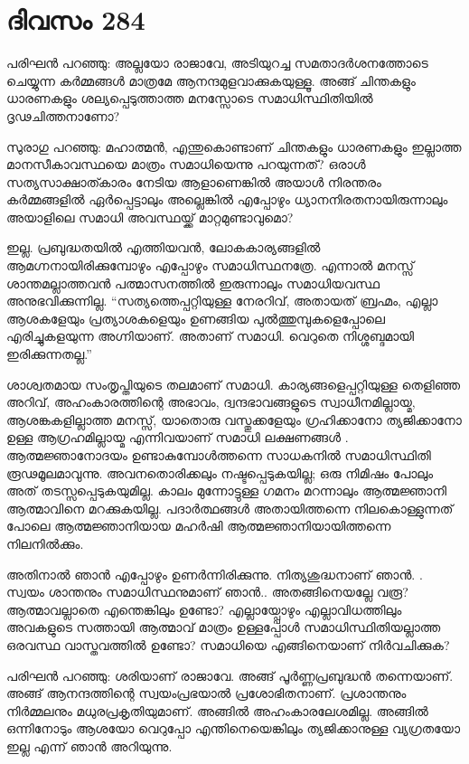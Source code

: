 \section{ദിവസം 284}


പരിഘന്‍ പറഞ്ഞു: അല്ലയോ രാജാവേ, അടിയുറച്ച സമതാദര്‍ശനത്തോടെ ചെയ്യുന്ന കര്‍മ്മങ്ങള്‍ മാത്രമേ ആനന്ദമുളവാക്കുകയുള്ളൂ. അങ്ങ് ചിന്തകളും ധാരണകളും ശല്യപ്പെടുത്താത്ത മനസ്സോടെ സമാധിസ്ഥിതിയില്‍ ദൃഢചിത്തനാണോ?

സുരാഗു പറഞ്ഞു: മഹാത്മന്‍, എന്തുകൊണ്ടാണ് ചിന്തകളും ധാരണകളും ഇല്ലാത്ത മാനസീകാവസ്ഥയെ മാത്രം സമാധിയെന്നു പറയുന്നത്? ഒരാള്‍ സത്യസാക്ഷാത്കാരം നേടിയ ആളാണെങ്കില്‍ അയാള്‍ നിരന്തരം കര്‍മ്മങ്ങളില്‍ ഏര്‍പ്പെട്ടാലും അല്ലെങ്കില്‍ എപ്പോഴും ധ്യാനനിരതനായിരുന്നാലും അയാളിലെ സമാധി അവസ്ഥയ്ക്ക് മാറ്റമുണ്ടാവുമൊ?

ഇല്ല. പ്രബുദ്ധതയില്‍ എത്തിയവന്‍, ലോകകാര്യങ്ങളില്‍ ആമഗ്നനായിരിക്കുമ്പോഴും എപ്പോഴും സമാധിസ്ഥനത്രേ. എന്നാല്‍ മനസ്സ് ശാന്തമല്ലാത്തവന്‍ പത്മാസനത്തില്‍ ഇരുന്നാലും  സമാധിയവസ്ഥ അനുഭവിക്കുന്നില്ല. “സത്യത്തെപ്പറ്റിയുള്ള നേരറിവ്, അതായത് ബ്രഹ്മം, എല്ലാ ആശകളേയും പ്രത്യാശകളെയും ഉണങ്ങിയ പുല്‍ത്തുമ്പുകളെപ്പോലെ എരിച്ചുകളയുന്ന അഗ്നിയാണ്. അതാണ്‌ സമാധി. വെറുതെ നിശ്ശബ്ദമായി ഇരിക്കുന്നതല്ല.”

ശാശ്വതമായ സംതൃപ്തിയുടെ തലമാണ് സമാധി. കാര്യങ്ങളെപ്പറ്റിയുള്ള തെളിഞ്ഞ അറിവ്, അഹംകാരത്തിന്റെ അഭാവം, ദ്വന്ദഭാവങ്ങളുടെ സ്വാധീനമില്ലായ്മ, ആശങ്കകളില്ലാത്ത മനസ്സ്, യാതൊരു വസ്തുക്കളേയും ഗ്രഹിക്കാനോ ത്യജിക്കാനോ ഉള്ള ആഗ്രഹമില്ലായ്മ എന്നിവയാണ് സമാധി ലക്ഷണങ്ങള്‍ .  ആത്മജ്ഞാനോദയം ഉണ്ടാകുമ്പോള്‍ത്തന്നെ സാധകനില്‍ സമാധിസ്ഥിതി രൂഢമൂലമാവുന്നു. അവനതൊരിക്കലും നഷ്ടപ്പെടുകയില്ല; ഒരു നിമിഷം പോലും അത് തടസ്സപ്പെടുകയുമില്ല. കാലം മുന്നോട്ടുള്ള ഗമനം മറന്നാലും ആത്മജ്ഞാനി ആത്മാവിനെ മറക്കുകയില്ല. പദാര്‍ത്ഥങ്ങള്‍ അതായിത്തന്നെ നിലകൊള്ളുന്നത് പോലെ ആത്മജ്ഞാനിയായ മഹര്‍ഷി ആത്മജ്ഞാനിയായിത്തന്നെ നിലനില്‍ക്കും.

അതിനാല്‍ ഞാന്‍ എപ്പോഴും ഉണര്‍ന്നിരിക്കുന്നു. നിത്യശുദ്ധനാണ് ഞാന്‍. . സ്വയം ശാന്തനും സമാധിസ്ഥനുമാണ് ഞാന്‍.. അതങ്ങിനെയല്ലേ വരൂ? ആത്മാവല്ലാതെ എന്തെങ്കിലും ഉണ്ടോ? എല്ലായ്പ്പോഴും എല്ലാവിധത്തിലും അവകളുടെ സത്തായി ആത്മാവ് മാത്രം ഉള്ളപ്പോള്‍ സമാധിസ്ഥിതിയല്ലാത്ത ഒരവസ്ഥ വാസ്തവത്തില്‍ ഉണ്ടോ? സമാധിയെ എങ്ങിനെയാണ് നിര്‍വചിക്കുക? 

പരിഘന്‍ പറഞ്ഞു: ശരിയാണ് രാജാവേ. അങ്ങ് പൂര്‍ണ്ണപ്രബുദ്ധന്‍ തന്നെയാണ്. അങ്ങ് ആനന്ദത്തിന്റെ സ്വയംപ്രഭയാല്‍ പ്രശോഭിതനാണ്. പ്രശാന്തനും നിര്‍മ്മലനും മധുരപ്രകൃതിയുമാണ്. അങ്ങില്‍ അഹംകാരലേശമില്ല. അങ്ങില്‍ ഒന്നിനോടും ആശയോ വെറുപ്പോ എന്തിനെയെങ്കിലും ത്യജിക്കാനുള്ള വ്യഗ്രതയോ ഇല്ല എന്ന് ഞാന്‍ അറിയുന്നു.

